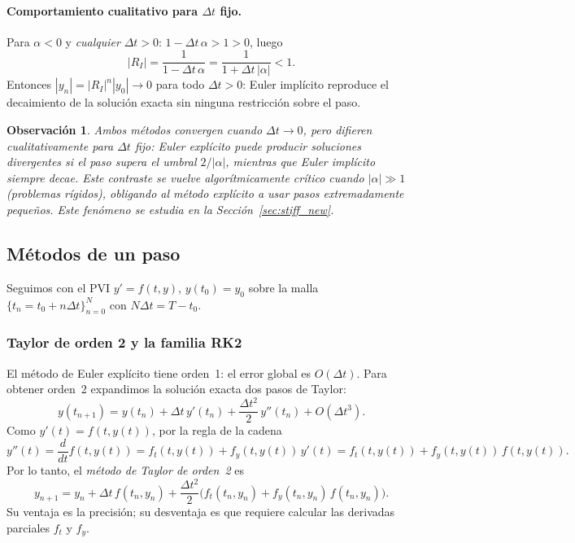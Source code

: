 \documentclass[a4paper,11pt]{report}
\newtheorem{remark}[theorem]{Observación}
\begin{document}
\paragraph{Comportamiento cualitativo para $\Delta t$ fijo.}
Para $\alpha<0$ y \emph{cualquier} $\Delta t>0$: $1-\Delta t\,\alpha>1>0$, luego
\[
  |R_I|=\frac{1}{1-\Delta t\,\alpha}=\frac{1}{1+\Delta t\,|\alpha|}<1.
\]
Entonces $|y_n|=|R_I|^n|y_0|\to0$ para todo $\Delta t>0$: Euler implícito reproduce el decaimiento de la solución exacta sin ninguna restricción sobre el paso.

\bigskip
\begin{remark}
Ambos métodos convergen cuando $\Delta t\to0$, pero difieren cualitativamente para $\Delta t$ fijo: Euler explícito puede producir soluciones divergentes si el paso supera el umbral $2/|\alpha|$, mientras que Euler implícito siempre decae. Este contraste se vuelve algorítmicamente crítico cuando $|\alpha|\gg1$ (problemas rígidos), obligando al método explícito a usar pasos extremadamente pequeños. Este fenómeno se estudia en la Sección~\ref{sec:stiff_new}.
\end{remark}

\subsection{Métodos de un paso}\label{sec:metodos_pvi_new}

Seguimos con el PVI $y'=f(t,y)$, $y(t_0)=y_0$ sobre la malla $\{t_n=t_0+n\Delta t\}_{n=0}^N$ con $N\Delta t=T-t_0$.

\subsubsection*{Taylor de orden 2 y la familia RK2}

El método de Euler explícito tiene orden~1: el error global es $O(\Delta t)$. Para obtener orden~2 expandimos la solución exacta dos pasos de Taylor:
\[
  y(t_{n+1})=y(t_n)+\Delta t\,y'(t_n)+\frac{\Delta t^2}{2}\,y''(t_n)+O(\Delta t^3).
\]
Como $y'(t)=f(t,y(t))$, por la regla de la cadena
\[
  y''(t)=\frac{d}{dt}f(t,y(t))=f_t(t,y(t))+f_y(t,y(t))\,y'(t)=f_t(t,y(t))+f_y(t,y(t))\,f(t,y(t)).
\]
Por lo tanto, el \emph{método de Taylor de orden~2} es
\[
  y_{n+1}=y_n+\Delta t\,f(t_n,y_n)+\frac{\Delta t^2}{2}\bigl(f_t(t_n,y_n)+f_y(t_n,y_n)\,f(t_n,y_n)\bigr).
\]
Su ventaja es la precisión; su desventaja es que requiere calcular las derivadas parciales $f_t$ y $f_y$.
\end{document}
